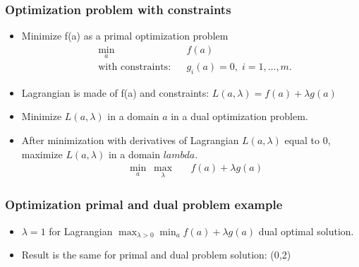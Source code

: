 \documentclass[proffesionalfonts]{beamer}
\begin{document}
\begin{frame}
\frametitle{Optimization problem with constraints}
\begin{itemize}
\item Minimize f(a) as a primal optimization problem
\begin{equation*}
\begin{aligned}
& \underset{a}{\min}
& & f(a) \\
& \text{with constraints:}
& & g_i(a) = 0, \; i = 1, \ldots, m.
\end{aligned}
\end{equation*}
\item Lagrangian is made of f(a) and constraints: $L(a,\lambda)=f(a)+\lambda g(a)$
\item Minimize $L(a,\lambda)$ in a domain $a$ in a dual optimization problem.
\item After minimization with derivatives of Lagrangian $L(a,\lambda)$ equal to 0, maximize $L(a,\lambda)$ in a domain $lambda$.
\begin{equation*}
\begin{aligned}
& \underset{a}{\min}\ \underset{\lambda}{\max} &  & f(a)+\lambda g(a)
\end{aligned}
\end{equation*}
\end{itemize}
\end{frame}

\begin{frame}
\scriptsize
\frametitle{Optimization primal and dual problem example}
\begin{block}{}
\begin{itemize}
\item $\lambda = 1$ for Lagrangian $\max_{\lambda>0}\min_{a}f(a)+\lambda g(a)$ dual optimal solution.
\item Result is the same for primal and dual problem solution: (0,2)
\end{itemize}
\end{block}
\end{frame}
\end{document}
